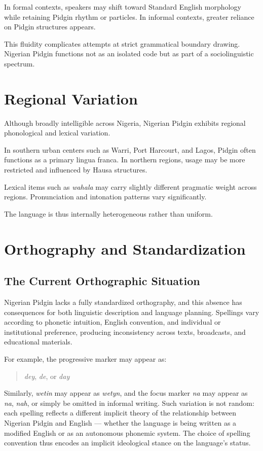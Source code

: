 \documentclass[12pt]{article}
\begin{document}
In formal contexts, speakers may shift toward Standard English morphology while retaining Pidgin rhythm or particles. In informal contexts, greater reliance on Pidgin structures appears.

This fluidity complicates attempts at strict grammatical boundary drawing. Nigerian Pidgin functions not as an isolated code but as part of a sociolinguistic spectrum.

\section{Regional Variation}

Although broadly intelligible across Nigeria, Nigerian Pidgin exhibits regional phonological and lexical variation.

In southern urban centers such as Warri, Port Harcourt, and Lagos, Pidgin often functions as a primary lingua franca. In northern regions, usage may be more restricted and influenced by Hausa structures.

Lexical items such as \textit{wahala} may carry slightly different pragmatic weight across regions. Pronunciation and intonation patterns vary significantly.

The language is thus internally heterogeneous rather than uniform.

\section{Orthography and Standardization}

\subsection{The Current Orthographic Situation}

Nigerian Pidgin lacks a fully standardized orthography, and this absence has consequences for both linguistic description and language planning. Spellings vary according to phonetic intuition, English convention, and individual or institutional preference, producing inconsistency across texts, broadcasts, and educational materials.

For example, the progressive marker may appear as:

\begin{quote}
\textit{dey}, \textit{de}, or \textit{day}
\end{quote}

Similarly, \textit{wetin} may appear as \textit{wetyn}, and the focus marker \textit{na} may appear as \textit{na}, \textit{nah}, or simply be omitted in informal writing. Such variation is not random: each spelling reflects a different implicit theory of the relationship between Nigerian Pidgin and English --- whether the language is being written as a modified English or as an autonomous phonemic system. The choice of spelling convention thus encodes an implicit ideological stance on the language's status.
\end{document}
